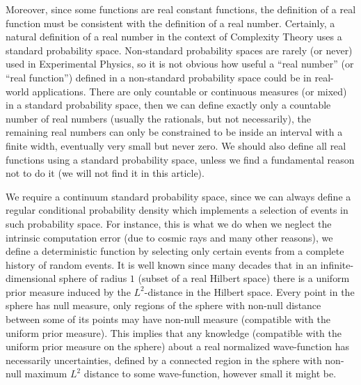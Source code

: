 \documentclass[11pt,a4paper]{report}
\begin{document}
Moreover, since some functions are real constant functions, the
definition of a real function must be consistent with the definition of
a real number. Certainly, a natural definition of a real number in the
context of Complexity Theory uses a standard probability space.
Non-standard probability spaces are rarely (or never) used in
Experimental Physics, so it is not obvious how useful a ``real number''
(or ``real function'') defined in a non-standard probability space could
be in real-world applications. There are only countable or continuous
measures (or mixed) in a standard probability space, then we can define
exactly only a countable number of real numbers (usually the rationals,
but not necessarily), the remaining real numbers can only be constrained
to be inside an interval with a finite width, eventually very small but
never zero. We should also define all real functions using a standard
probability space, unless we find a fundamental reason not to do it (we
will not find it in this article).

We require a continuum standard probability space, since we can always
define a regular conditional probability density which implements a
selection of events in such probability
space\cite{durrett2019probability}. For
instance, this is what we do when we neglect the intrinsic computation
error (due to cosmic rays and many other reasons), we define a
deterministic function by selecting only certain events from a complete
history of random events. It is well known since many decades that in an
infinite-dimensional sphere of radius \(1\) (subset of a real Hilbert
space) there is a uniform prior measure induced by the \(L^2\)-distance
in the Hilbert
space\cite{Peterson2019GaussianLA}.
Every point in the sphere has null measure, only regions of the sphere
with non-null distance between some of its points may have non-null
measure (compatible with the uniform prior measure). This implies that
any knowledge (compatible with the uniform prior measure on the sphere)
about a real normalized wave-function has necessarily uncertainties,
defined by a connected region in the sphere with non-null maximum
\(L^2\) distance to some wave-function, however small it might be.
\end{document}
